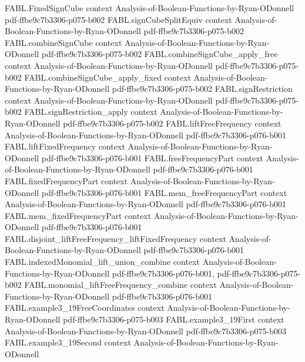 \begin{theorem}
\proofstep
  {FABL.FixedSignCube}
  {context}
  {Analysis-of-Boolean-Functions-by-Ryan-ODonnell}
  {pdf-ffbe9c7b3306-p075-b002}
\proofstep
  {FABL.signCubeSplitEquiv}
  {context}
  {Analysis-of-Boolean-Functions-by-Ryan-ODonnell}
  {pdf-ffbe9c7b3306-p075-b002}
\proofstep
  {FABL.combineSignCube}
  {context}
  {Analysis-of-Boolean-Functions-by-Ryan-ODonnell}
  {pdf-ffbe9c7b3306-p075-b002}
\proofstep
  {FABL.combineSignCube_apply_free}
  {context}
  {Analysis-of-Boolean-Functions-by-Ryan-ODonnell}
  {pdf-ffbe9c7b3306-p075-b002}
\proofstep
  {FABL.combineSignCube_apply_fixed}
  {context}
  {Analysis-of-Boolean-Functions-by-Ryan-ODonnell}
  {pdf-ffbe9c7b3306-p075-b002}
\proofstep
  {FABL.signRestriction}
  {context}
  {Analysis-of-Boolean-Functions-by-Ryan-ODonnell}
  {pdf-ffbe9c7b3306-p075-b002}
\proofstep
  {FABL.signRestriction_apply}
  {context}
  {Analysis-of-Boolean-Functions-by-Ryan-ODonnell}
  {pdf-ffbe9c7b3306-p075-b002}
\proofstep
  {FABL.liftFreeFrequency}
  {context}
  {Analysis-of-Boolean-Functions-by-Ryan-ODonnell}
  {pdf-ffbe9c7b3306-p076-b001}
\proofstep
  {FABL.liftFixedFrequency}
  {context}
  {Analysis-of-Boolean-Functions-by-Ryan-ODonnell}
  {pdf-ffbe9c7b3306-p076-b001}
\proofstep
  {FABL.freeFrequencyPart}
  {context}
  {Analysis-of-Boolean-Functions-by-Ryan-ODonnell}
  {pdf-ffbe9c7b3306-p076-b001}
\proofstep
  {FABL.fixedFrequencyPart}
  {context}
  {Analysis-of-Boolean-Functions-by-Ryan-ODonnell}
  {pdf-ffbe9c7b3306-p076-b001}
\proofstep
  {FABL.mem_freeFrequencyPart}
  {context}
  {Analysis-of-Boolean-Functions-by-Ryan-ODonnell}
  {pdf-ffbe9c7b3306-p076-b001}
\proofstep
  {FABL.mem_fixedFrequencyPart}
  {context}
  {Analysis-of-Boolean-Functions-by-Ryan-ODonnell}
  {pdf-ffbe9c7b3306-p076-b001}
\proofstep
  {FABL.disjoint_liftFreeFrequency_liftFixedFrequency}
  {context}
  {Analysis-of-Boolean-Functions-by-Ryan-ODonnell}
  {pdf-ffbe9c7b3306-p076-b001}
\proofstep
  {FABL.indexedMonomial_lift_union_combine}
  {context}
  {Analysis-of-Boolean-Functions-by-Ryan-ODonnell}
  {pdf-ffbe9c7b3306-p076-b001,
    pdf-ffbe9c7b3306-p075-b002}
\proofstep
  {FABL.monomial_liftFreeFrequency_combine}
  {context}
  {Analysis-of-Boolean-Functions-by-Ryan-ODonnell}
  {pdf-ffbe9c7b3306-p076-b001}
\proofstep
  {FABL.example3_19FreeCoordinates}
  {context}
  {Analysis-of-Boolean-Functions-by-Ryan-ODonnell}
  {pdf-ffbe9c7b3306-p075-b003}
\proofstep
  {FABL.example3_19First}
  {context}
  {Analysis-of-Boolean-Functions-by-Ryan-ODonnell}
  {pdf-ffbe9c7b3306-p075-b003}
\proofstep
  {FABL.example3_19Second}
  {context}
  {Analysis-of-Boolean-Functions-by-Ryan-ODonnell}

\end{theorem}

